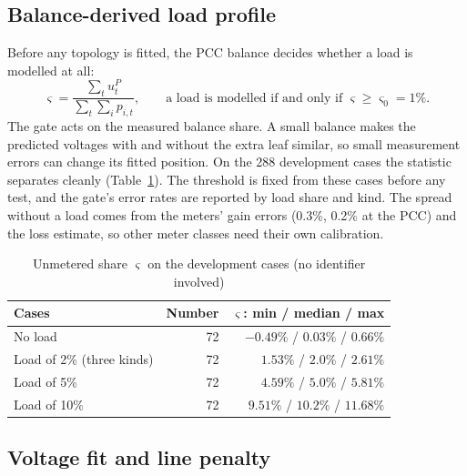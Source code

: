 \documentclass[journal,onecolumn,11pt]{IEEEtran}
\begin{document}
\subsection{Balance-derived load profile}\label{sec:gate}

Before any topology is fitted, the PCC balance decides whether a load is modelled at all:
\begin{equation}\label{eq:gate}
\varsigma=\frac{\sum_tu^P_t}{\sum_t\sum_ip_{i,t}},\qquad\text{a load is modelled if and only if }\varsigma\ge\varsigma_0=1\%.
\end{equation}
The gate acts on the measured balance share. A small balance makes the predicted voltages with and without
the extra leaf similar, so small measurement errors can change its fitted position. On the 288 development cases the statistic separates cleanly (Table~\ref{tab:gate}). The threshold is
fixed from these cases before any test, and the gate's error rates are reported by load share and kind. The spread without a
load comes from the meters' gain errors (0.3\%, 0.2\% at the PCC) and the loss estimate, so other meter classes need their
own calibration.
\begin{table}[htbp]
\caption{Unmetered share $\varsigma$ on the development cases (no identifier involved)}\label{tab:gate}
\centering
\begin{tabular}{@{}lrr@{}}
\toprule
Cases & Number & $\varsigma$: min / median / max\\
\midrule
No load & 72 & $-0.49\%$ / $0.03\%$ / $0.66\%$\\
Load of 2\% (three kinds) & 72 & $1.53\%$ / $2.0\%$ / $2.61\%$\\
Load of 5\% & 72 & $4.59\%$ / $5.0\%$ / $5.81\%$\\
Load of 10\% & 72 & $9.51\%$ / $10.2\%$ / $11.68\%$\\
\bottomrule
\end{tabular}
\end{table}

\subsection{Voltage fit and line penalty}\label{sec:score}
\end{document}
